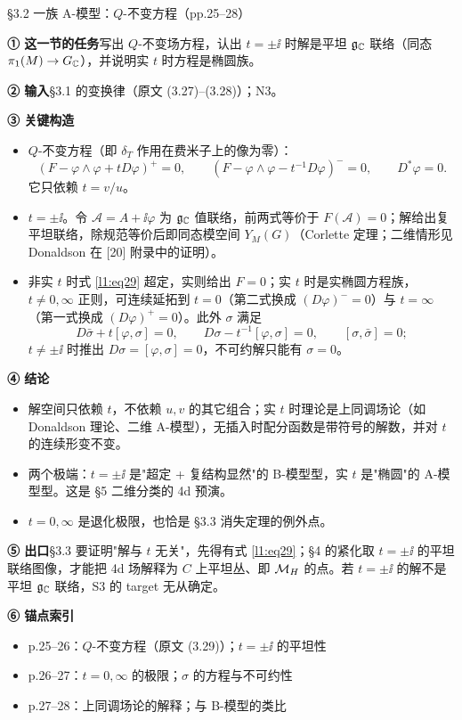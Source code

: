 \begin{kcard}{§3.2 一族 A-模型：$Q$-不变方程（pp.25--28）}

\noindent\textbf{① 这一节的任务}\quad 写出 $Q$-不变场方程，认出 $t=\pm\ii$ 时解是平坦 $\mathfrak{g}_{\mathbb{C}}$ 联络（同态 $\pi_1(M)\to G_{\mathbb{C}}$），并说明实 $t$ 时方程是椭圆族。\pA{}

\noindent\textbf{② 输入}\quad \S3.1 的变换律（原文 (3.27)--(3.28)）；N3。

\noindent\textbf{③ 关键构造}\quad
\begin{itemize}
\item $Q$-不变方程（即 $\delta_T$ 作用在费米子上的像为零）：
\begin{equation}\label{l1:eq29}\tag{3.29}
(F-\varphi\wedge\varphi+tD\varphi)^+=0,\qquad
(F-\varphi\wedge\varphi-t^{-1}D\varphi)^-=0,\qquad D^*\varphi=0 .
\end{equation}
它只依赖 $t=v/u$。\pA{}
\item $t=\pm\ii$。令 $\mathcal A=A+\ii\varphi$ 为 $\mathfrak{g}_{\mathbb{C}}$ 值联络，前两式等价于 $F(\mathcal A)=0$；解给出复平坦联络，除规范等价后即同态模空间 $Y_M(G)$（Corlette 定理；二维情形见 Donaldson 在 [20] 附录中的证明）。\pA{}
\item 非实 $t$ 时式 \eqref{l1:eq29} 超定，实则给出 $F=0$；实 $t$ 时是实椭圆方程族，$t\ne0,\infty$ 正则，可连续延拓到 $t=0$（第二式换成 $(D\varphi)^-=0$）与 $t=\infty$（第一式换成 $(D\varphi)^+=0$）。此外 $\sigma$ 满足
\[
D\bar\sigma+t[\varphi,\sigma]=0,\qquad D\sigma-t^{-1}[\varphi,\sigma]=0,\qquad[\sigma,\bar\sigma]=0 ;
\]
$t\ne\pm\ii$ 时推出 $D\sigma=[\varphi,\sigma]=0$，不可约解只能有 $\sigma=0$。\pA{}
\end{itemize}

\noindent\textbf{④ 结论}\quad
\begin{itemize}
\item 解空间只依赖 $t$，不依赖 $u,v$ 的其它组合；实 $t$ 时理论是上同调场论（如 Donaldson 理论、二维 A-模型），无插入时配分函数是带符号的解数，并对 $t$ 的连续形变不变。\pA{}
\item 两个极端：$t=\pm\ii$ 是"超定 + 复结构显然"的 B-模型型，实 $t$ 是"椭圆"的 A-模型型。这是 \S5 二维分类的 4d 预演。\pA{}
\item $t=0,\infty$ 是退化极限，也恰是 \S3.3 消失定理的例外点。\pA{}
\end{itemize}

\noindent\textbf{⑤ 出口}\quad \S3.3 要证明"解与 $t$ 无关"，先得有式 \eqref{l1:eq29}；\S4 的紧化取 $t=\pm\ii$ 的平坦联络图像，才能把 4d 场解释为 $C$ 上平坦丛、即 $\mathcal{M}_H$ 的点。若 $t=\pm\ii$ 的解不是平坦 $\mathfrak{g}_{\mathbb{C}}$ 联络，S3 的 target 无从确定。\pB{}

\noindent\textbf{⑥ 锚点索引}\quad
\begin{itemize}
\item p.25--26：$Q$-不变方程（原文 (3.29)）；$t=\pm\ii$ 的平坦性
\item p.26--27：$t=0,\infty$ 的极限；$\sigma$ 的方程与不可约性
\item p.27--28：上同调场论的解释；与 B-模型的类比
\end{itemize}
\end{kcard}

